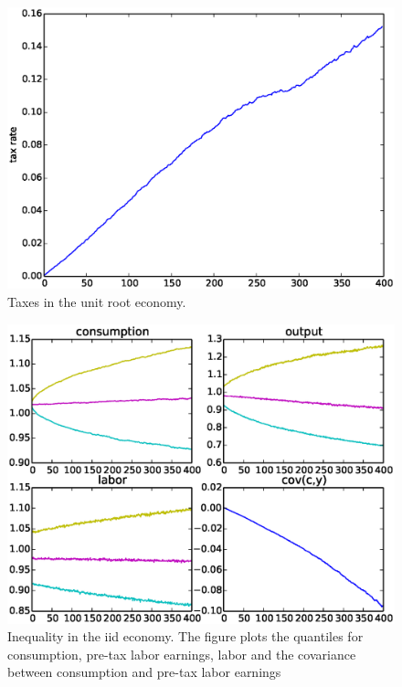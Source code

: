 \documentclass[thmsb,11pt]{article}
\begin{document}
  \begin{figure}[htp]
 \centering
 \includegraphics[width=\textwidth]{tax_pers.eps}
 \caption{Taxes in the unit root economy.}
 \label{fig:taxes_pers}
 \end{figure}




  \begin{figure}[htp]
 \centering
 \includegraphics[width=\textwidth]{quant_iid.eps}
 \caption{Inequality in the iid economy. The figure plots the quantiles for consumption, pre-tax labor earnings, labor and the covariance between consumption and pre-tax labor earnings}
 \label{fig:quant_iid}
 \end{figure}
\end{document}
